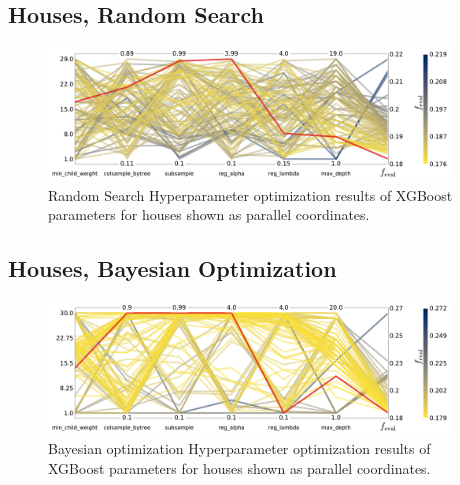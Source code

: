 \FloatBarrier
\subsection*{Houses, Random Search}
\begin{figure}[h!]
  \includegraphics[width=0.95\textwidth, trim=0 0 0 0, clip]{figures/housing/Villa_v19_cut_all_Ncols_all_CV_viz_HPO_RS.pdf}
  \caption[Parallel Coordinate Plot of the Hyperparameter Optimization for Houses Using Random Search]
          {Random Search Hyperparameter optimization results of XGBoost parameters for houses shown as parallel coordinates.} 
  \label{fig:h:CV_res_RS_parallel_coords_villa}
\end{figure}

\FloatBarrier
\subsection*{Houses, Bayesian Optimization}
\begin{figure}[h!]
  \includegraphics[width=0.95\textwidth, trim=0 0 0 0, clip]{figures/housing/Villa_v19_cut_all_Ncols_all_CV_viz_HPO_BO.pdf}
  \caption[Parallel Coordinate Plot of the Hyperparameter Optimization for Houses Using Bayesian Optimization]
          {Bayesian optimization Hyperparameter optimization results of XGBoost parameters for houses shown as parallel coordinates.}
  \label{fig:h:CV_res_BO_parallel_coords_villa}
\end{figure}



